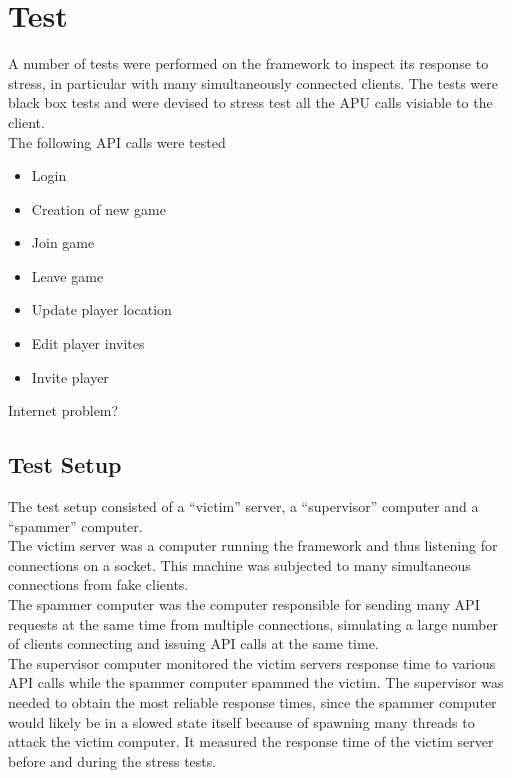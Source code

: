 \section{Test}
A number of tests were performed on the framework to inspect its response to stress, in particular with many simultaneously connected clients. The tests were black box tests and were devised to stress test all the APU calls visiable to the client.\\

The following API calls were tested
\begin{itemize}
\item Login
\item Creation of new game
\item Join game
\item Leave game
\item Update player location
\item Edit player invites
\item Invite player
\end{itemize}

Internet problem?

\subsection{Test Setup}
The test setup consisted of a ``victim'' server, a ``supervisor'' computer and a ``spammer'' computer.\\

The victim server was a computer running the framework and thus listening for connections on a socket. This machine was subjected to many simultaneous connections from fake clients.\\

The spammer computer was the computer responsible for sending many API requests at the same time from multiple connections, simulating a large number of clients connecting and issuing API calls at the same time.\\

The supervisor computer monitored the victim servers response time to various API calls while the spammer computer spammed the victim. The supervisor was needed to obtain the most reliable response times, since the spammer computer would likely be in a slowed state itself because of spawning many threads to attack the victim computer. It measured the response time of the victim server before and during the stress tests.
